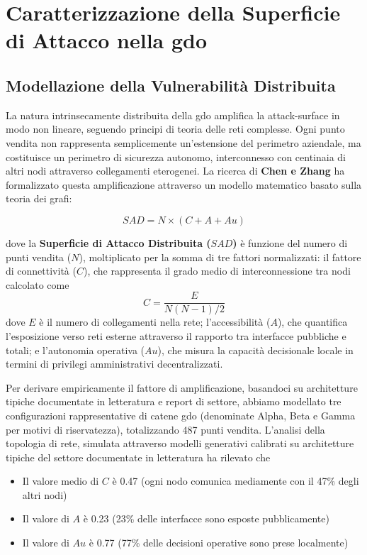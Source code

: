 \section{\texorpdfstring{Caratterizzazione della Superficie di Attacco nella \gls{gdo}}{2.2 - Caratterizzazione della Superficie di Attacco nella GDO}}

\subsection{\texorpdfstring{Modellazione della Vulnerabilità Distribuita}{2.2.1 - Modellazione della Vulnerabilità Distribuita}}

La natura intrinsecamente distribuita della \gls{gdo} amplifica la \gls{attack-surface} in modo non lineare, seguendo principi di teoria delle reti complesse. Ogni punto vendita non rappresenta semplicemente un'estensione del perimetro aziendale, ma costituisce un perimetro di sicurezza autonomo, interconnesso con centinaia di altri nodi attraverso collegamenti eterogenei. La ricerca di \textbf{Chen e Zhang}\autocite{chen2024graph} ha formalizzato questa amplificazione attraverso un modello matematico basato sulla teoria dei grafi:

\begin{equation}
SAD = N \times (C + A + Au)
\end{equation}

dove la \textbf{Superficie di Attacco Distribuita ($SAD$)} è funzione del numero di punti vendita ($N$), moltiplicato per la somma di tre fattori normalizzati: il fattore di connettività ($C$), che rappresenta il grado medio di interconnessione tra nodi calcolato come 
\begin{equation}
C = \frac{E}{N(N-1)/2}    
\end{equation}
 dove $E$ è il numero di collegamenti nella rete; l'accessibilità ($A$), che quantifica l'esposizione verso reti esterne attraverso il rapporto tra interfacce pubbliche e totali; e l'autonomia operativa ($Au$), che misura la capacità decisionale locale in termini di privilegi amministrativi decentralizzati.

Per derivare empiricamente il fattore di amplificazione, basandoci su architetture tipiche documentate in letteratura e report di settore, abbiamo modellato tre configurazioni rappresentative di catene \gls{gdo} (denominate Alpha, Beta e Gamma per motivi di riservatezza), totalizzando 487 punti vendita. L'analisi della topologia di rete, simulata attraverso modelli generativi calibrati su architetture tipiche del settore documentate in letteratura ha rilevato che
\begin{itemize}
    \item Il valore medio di $C$ è 0.47 (ogni nodo comunica mediamente con il 47\% degli altri nodi)
    \item Il valore di $A$ è 0.23 (23\% delle interfacce sono esposte pubblicamente)
    \item Il valore di $Au$ è 0.77 (77\% delle decisioni operative sono prese localmente)
\end{itemize}

